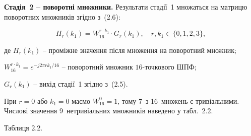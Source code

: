 \documentclass[
]{article}
\begin{document}
\textbf{Стадія~2 -- поворотні множники.} Результати стадії~1 множаться
на матрицю поворотних множників згідно з~(2.6):

\begin{equation}
\tag{2.6}\label{eq:stage2-Hr}
H_{r}(k_{1}) = W_{16}^{r \cdot k_{1}} \cdot G_{r}(k_{1}),\quad r,k_{1} \in \{ 0,1,2,3\},
\end{equation}

де \(H_{r}(k_{1})\) -- проміжне значення після множення на поворотний множник;

\(W_{16}^{r \cdot k_{1}} = e^{- j2\pi r k_{1}/16}\) -- поворотний множник \(\mathrm{16}\)-точкового ШПФ;

\(G_{r}(k_{1})\) -- вихід стадії~1 згідно з~(2.5).

При \(r = 0\) або \(k_{1} = 0\) маємо \(W_{16}^{0} = 1\), тому 7~з
16~множень є тривіальними. Числові значення 9~нетривіальних множників
наведено у табл.~2.2.

Таблиця 2.2.
\end{document}
